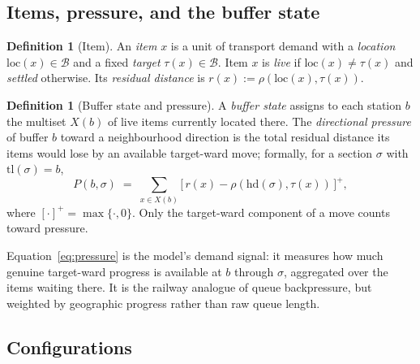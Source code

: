 \documentclass[11pt,twocolumn,a4paper]{article}
\theoremstyle{definition}
\newtheorem{definition}[theorem]{Definition}
\theoremstyle{remark}
\newcommand{\stations}{\mathcal{B}}
\begin{document}
\subsection{Items, pressure, and the buffer state}

\begin{definition}[Item]
\label{def:item}
An \emph{item} $x$ is a unit of transport demand with a \emph{location} $\mathrm{loc}(x)\in\stations$ and a fixed \emph{target} $\tau(x)\in\stations$. Item $x$ is \emph{live} if $\mathrm{loc}(x)\neq\tau(x)$ and \emph{settled} otherwise. Its \emph{residual distance} is $r(x) := \rho(\mathrm{loc}(x),\tau(x))$.
\end{definition}

\begin{definition}[Buffer state and pressure]
\label{def:pressure}
A \emph{buffer state} assigns to each station $b$ the multiset $X(b)$ of live items currently located there. The \emph{directional pressure} of buffer $b$ toward a neighbourhood direction is the total residual distance its items would lose by an available target-ward move; formally, for a section $\sigma$ with $\mathrm{tl}(\sigma)=b$,
\begin{equation}
\label{eq:pressure}
P(b,\sigma) \;=\; \sum_{x \in X(b)} \big[\, r(x) - \rho(\mathrm{hd}(\sigma),\tau(x)) \,\big]^{+},
\end{equation}
where $[\cdot]^+ = \max\{\cdot,0\}$. Only the target-ward component of a move counts toward pressure.
\end{definition}

Equation~\eqref{eq:pressure} is the model's demand signal: it measures how much genuine target-ward progress is available at $b$ through $\sigma$, aggregated over the items waiting there. It is the railway analogue of queue backpressure, but weighted by geographic progress rather than raw queue length.

\subsection{Configurations}
\end{document}
